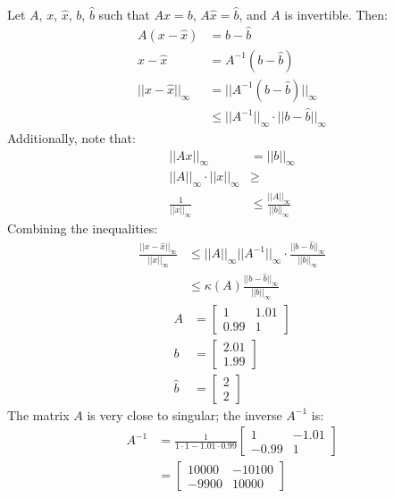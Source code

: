 \documentclass{article}
\begin{document}
\problem{}
Let $A$, $x$, $\hat{x}$, $b$, $\hat{b}$ such that $Ax = b$, $A\hat{x} = \hat{b}$, and $A$ is invertible. Then:
\begin{align*}
    A(x - \hat{x}) & = b - \hat{b} \\
    x - \hat{x} & = A^{-1}(b - \hat{b}) \\
    ||x - \hat{x}||_\infty & = ||A^{-1}(b - \hat{b})||_\infty \\
    & \leq ||A^{-1}||_\infty \cdot ||b - \hat{b}||_\infty
\end{align*}
Additionally, note that:
\begin{align*}
    ||Ax||_\infty & = ||b||_\infty \\
    ||A||_\infty \cdot ||x||_\infty & \geq \\
    \frac{1}{||x||_\infty} & \leq \frac{||A||_\infty}{||b||_\infty}
\end{align*}
Combining the inequalities:
\begin{align*}
    \frac{||x - \hat{x}||_\infty}{||x||_\infty} & \leq ||A||_\infty||A^{-1}||_\infty \cdot \frac{||b - \hat{b}||_\infty}{||b||_\infty} \\
    & \leq \kappa(A)\frac{||b - \hat{b}||_\infty}{||b||_\infty}
\end{align*}
\begin{align*}
    A & = \begin{bmatrix}
        1 & 1.01 \\ 0.99 & 1
    \end{bmatrix} \\
    b & = \begin{bmatrix}
        2.01 \\ 1.99
    \end{bmatrix} \\
    \hat{b} & = \begin{bmatrix}
        2 \\ 2
    \end{bmatrix}
\end{align*}
The matrix $A$ is very close to singular; the inverse $A^{-1}$ is:
\begin{align*}
    A^{-1} & = \frac{1}{1 \cdot 1 - 1.01 \cdot 0.99}\begin{bmatrix}
        1 & -1.01 \\ -0.99 & 1
    \end{bmatrix} \\
    & = \begin{bmatrix}
        10000 & -10100 \\ -9900 & 10000
    \end{bmatrix}
\end{align*}
\end{document}
